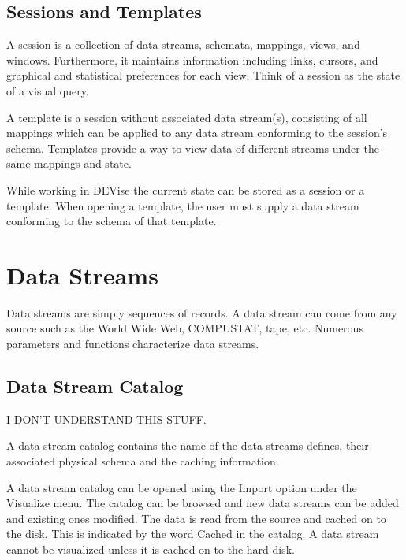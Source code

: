 \subsection{Sessions and Templates}

A session is a collection of data streams, schemata, mappings, views, and
windows. Furthermore, it maintains information including links, cursors, and
graphical and statistical preferences for each view. Think of a session as the
state of a visual query.

A template is a session without associated data stream(s), consisting of all
mappings which can be applied to any data stream conforming to the session's
schema. Templates provide a way to view data of different streams under the same
mappings and state.

While working in DEVise the current state can be stored as a session or a
template. When opening a template, the user must supply a data stream conforming
to the schema of that template.


\section{Data Streams}

Data streams are simply sequences of records. A data stream can come from any
source such as the World Wide Web, COMPUSTAT, tape, etc. Numerous parameters and
functions characterize data streams.


\subsection{Data Stream Catalog}

I DON'T UNDERSTAND THIS STUFF.

A data stream catalog contains the name of the data streams defines, their
associated physical schema and the caching information.

A data stream catalog can be opened using the Import option under the Visualize
menu. The catalog can be browsed and new data streams can be added and existing
ones modified. The data is read from the source and cached on to the disk. This
is indicated by the word Cached in the catalog. A data stream cannot be
visualized unless it is cached on to the hard disk.

